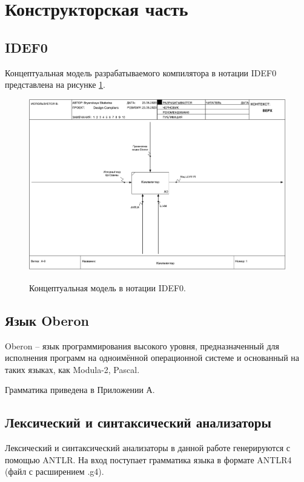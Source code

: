 \section{Конструкторская часть}
\subsection{IDEF0}
Концептуальная модель разрабатываемого компилятора в нотации IDEF0 представлена на рисунке \ref{fig:idef0}.

\begin{figure}[h]
	\begin{center}
		{\includegraphics[scale = 0.8, page=1]{img/idef0/01_A-0.pdf}}
		\caption{Концептуальная модель в нотации IDEF0.}
		\label{fig:idef0}
	\end{center}
\end{figure}

\subsection{Язык Oberon}
Oberon -- язык программирования высокого уровня, предназначенный для исполнения программ на одноимённой операционной системе и основанный на таких языках, как Modula-2, Pascal. 

Грамматика приведена в Приложении А. \\

\subsection{Лексический и синтаксический анализаторы}
Лексический и синтаксический анализаторы в данной работе генерируются с помощью ANTLR. На вход поступает грамматика языка в формате ANTLR4 (файл с расширением .g4). 

